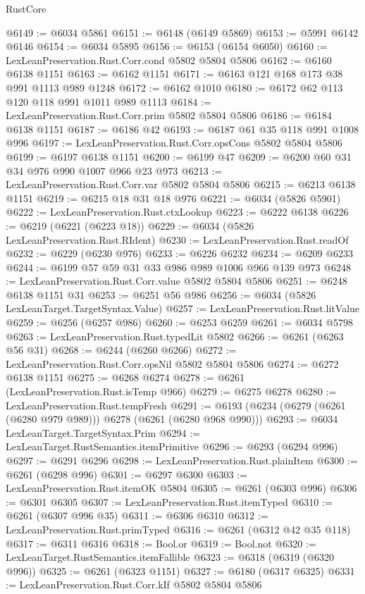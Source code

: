 \begin{lexlean}{RustCore}
\begin{coremodule}
@6149 := @6034 @5861
@6151 := @6148 (@6149 @5869)
@6153 := @5991 @6142 @6146
@6154 := @6034 @5895
@6156 := @6153 (@6154 @6050)
@6160 := LexLeanPreservation.Rust.Corr.cond @5802 @5804 @5806
@6162 := @6160 @6138 @1151
@6163 := @6162 @1151
@6171 := @6163 @121 @168 @173 @38 @991 @1113 @989 @1248
@6172 := @6162 @1010
@6180 := @6172 @62 @113 @120 @118 @991 @1011 @989 @1113
@6184 := LexLeanPreservation.Rust.Corr.prim @5802 @5804 @5806
@6186 := @6184 @6138 @1151
@6187 := @6186 @42
@6193 := @6187 @61 @35 @118 @991 @1008 @996
@6197 := LexLeanPreservation.Rust.Corr.opsCons @5802 @5804 @5806
@6199 := @6197 @6138 @1151
@6200 := @6199 @47
@6209 := @6200 @60 @31 @34 @976 @990 @1007 @966 @23 @973
@6213 := LexLeanPreservation.Rust.Corr.var @5802 @5804 @5806
@6215 := @6213 @6138 @1151
@6219 := @6215 @18 @31 @18 @976
@6221 := @6034 (@5826 @5901)
@6222 := LexLeanPreservation.Rust.ctxLookup
@6223 := @6222 @6138
@6226 := @6219 (@6221 (@6223 @18))
@6229 := @6034 (@5826 LexLeanPreservation.Rust.RIdent)
@6230 := LexLeanPreservation.Rust.readOf
@6232 := @6229 (@6230 @976)
@6233 := @6226 @6232
@6234 := @6209 @6233
@6244 := @6199 @57 @59 @31 @33 @986 @989 @1006 @966 @139 @973
@6248 := LexLeanPreservation.Rust.Corr.value @5802 @5804 @5806
@6251 := @6248 @6138 @1151 @31
@6253 := @6251 @56 @986
@6256 := @6034 (@5826 LexLeanTarget.TargetSyntax.Value)
@6257 := LexLeanPreservation.Rust.litValue
@6259 := @6256 (@6257 @986)
@6260 := @6253 @6259
@6261 := @6034 @5798
@6263 := LexLeanPreservation.Rust.typedLit @5802
@6266 := @6261 (@6263 @56 @31)
@6268 := @6244 (@6260 @6266)
@6272 := LexLeanPreservation.Rust.Corr.opsNil @5802 @5804 @5806
@6274 := @6272 @6138 @1151
@6275 := @6268 @6274
@6278 := @6261 (LexLeanPreservation.Rust.isTemp @966)
@6279 := @6275 @6278
@6280 := LexLeanPreservation.Rust.tempFresh
@6291 := @6193 (@6234 (@6279 (@6261 (@6280 @979 @989))) @6278 (@6261 (@6280 @968 @990)))
@6293 := @6034 LexLeanTarget.TargetSyntax.Prim
@6294 := LexLeanTarget.RustSemantics.itemPrimitive
@6296 := @6293 (@6294 @996)
@6297 := @6291 @6296
@6298 := LexLeanPreservation.Rust.plainItem
@6300 := @6261 (@6298 @996)
@6301 := @6297 @6300
@6303 := LexLeanPreservation.Rust.itemOK @5804
@6305 := @6261 (@6303 @996)
@6306 := @6301 @6305
@6307 := LexLeanPreservation.Rust.itemTyped
@6310 := @6261 (@6307 @996 @35)
@6311 := @6306 @6310
@6312 := LexLeanPreservation.Rust.primTyped
@6316 := @6261 (@6312 @42 @35 @118)
@6317 := @6311 @6316
@6318 := Bool.or
@6319 := Bool.not
@6320 := LexLeanTarget.RustSemantics.itemFallible
@6323 := @6318 (@6319 (@6320 @996))
@6325 := @6261 (@6323 @1151)
@6327 := @6180 (@6317 @6325)
@6331 := LexLeanPreservation.Rust.Corr.kIf @5802 @5804 @5806

\end{coremodule}
\end{lexlean}
